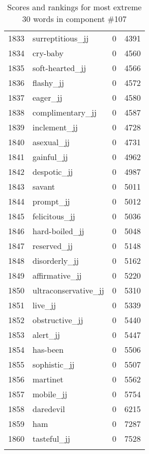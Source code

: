 \begin{longtable}[!htbp]{| rlr@{.}l |}
    1833 & surreptitious\_jj & 0 & 4391 \\
    1834 & cry-baby & 0 & 4560 \\
    1835 & soft-hearted\_jj & 0 & 4566 \\
    1836 & flashy\_jj & 0 & 4572 \\
    1837 & eager\_jj & 0 & 4580 \\
    1838 & complimentary\_jj & 0 & 4587 \\
    1839 & inclement\_jj & 0 & 4728 \\
    1840 & asexual\_jj & 0 & 4731 \\
    1841 & gainful\_jj & 0 & 4962 \\
    1842 & despotic\_jj & 0 & 4987 \\
    1843 & savant & 0 & 5011 \\
    1844 & prompt\_jj & 0 & 5012 \\
    1845 & felicitous\_jj & 0 & 5036 \\
    1846 & hard-boiled\_jj & 0 & 5048 \\
    1847 & reserved\_jj & 0 & 5148 \\
    1848 & disorderly\_jj & 0 & 5162 \\
    1849 & affirmative\_jj & 0 & 5220 \\
    1850 & ultraconservative\_jj & 0 & 5310 \\
    1851 & live\_jj & 0 & 5339 \\
    1852 & obstructive\_jj & 0 & 5440 \\
    1853 & alert\_jj & 0 & 5447 \\
    1854 & has-been & 0 & 5506 \\
    1855 & sophistic\_jj & 0 & 5507 \\
    1856 & martinet & 0 & 5562 \\
    1857 & mobile\_jj & 0 & 5754 \\
    1858 & daredevil & 0 & 6215 \\
    1859 & ham & 0 & 7287 \\
    1860 & tasteful\_jj & 0 & 7528 \\
    \hline
    \caption{Scores and rankings for most extreme 30 words in component \#107} \\
\end{longtable}
